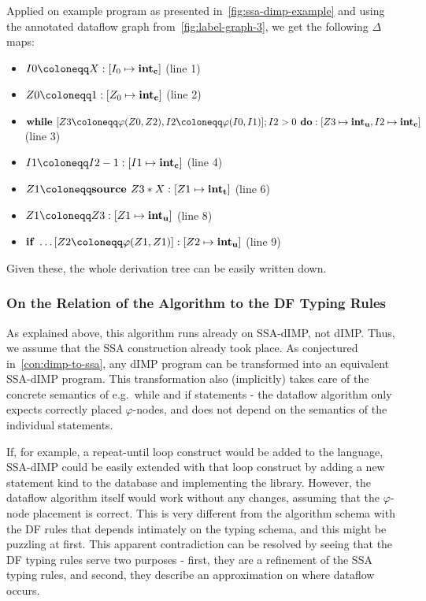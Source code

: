 Applied on example program as presented in~\autoref{fig:ssa-dimp-example} 
and using the annotated dataflow graph from~\autoref{fig:label-graph-3}, we 
get the following $\Delta$ maps:
\begin{itemize}
    \item $\storecmd{I0}{X}: [I_0 \mapsto \lclean]$ (line 1)
    \item $\storecmd{Z0}{1}: [Z_0 \mapsto \lclean]$ (line 2)
    \item $\textbf{while } [\phistore{Z3}{Z0}{Z2}, \phistore{I2}{I0}{I1}];
     I2 > 0 \textbf{ do}: [Z3 \mapsto \lunknown, I2 \mapsto \lclean]$ (line 3)
    \item $\storecmd{I1}{I2 - 1}: [I1 \mapsto \lclean]$ (line 4)
    \item $\storecmd{Z1}{\source{Z3 * X}}: [Z1 \mapsto \ltracked]$ (line 6)
    \item $\storecmd{Z1}{Z3}: [Z1 \mapsto \lunknown]$ (line 8)
    \item $\textbf{if } \ldots [\phistore{Z2}{Z1}{Z1}]: [Z2 \mapsto \lunknown]$ (line 9)
\end{itemize}
Given these, the whole derivation tree can be easily written down.

\subsubsection*{On the Relation of the Algorithm to the DF Typing Rules}
As explained above, this algorithm runs already on SSA-dIMP, not dIMP.
Thus, we assume that the SSA construction already took place.
As conjectured in~\autoref{con:dimp-to-ssa}, any dIMP program can be transformed into an equivalent
SSA-dIMP program.
This transformation also (implicitly) takes care of the concrete semantics of e.g.\ 
while and if statements - the dataflow algorithm only expects correctly placed $\varphi$-nodes,
and does not depend on the semantics of the individual statements.

If, for example, a repeat-until loop construct would be added to the language,
SSA-dIMP could be easily extended with that loop construct by adding a new statement 
kind to the database and implementing the library.
However, the dataflow algorithm itself would work without any changes, assuming that
the $\varphi$-node placement is correct.
This is very different from the algorithm schema with the DF rules that depends intimately on the 
typing schema, and this might be puzzling at first.
This apparent contradiction can be resolved by seeing that the DF typing 
rules serve two purposes - first, they are a refinement of the SSA typing rules,
and second, they describe an approximation on where dataflow occurs.

